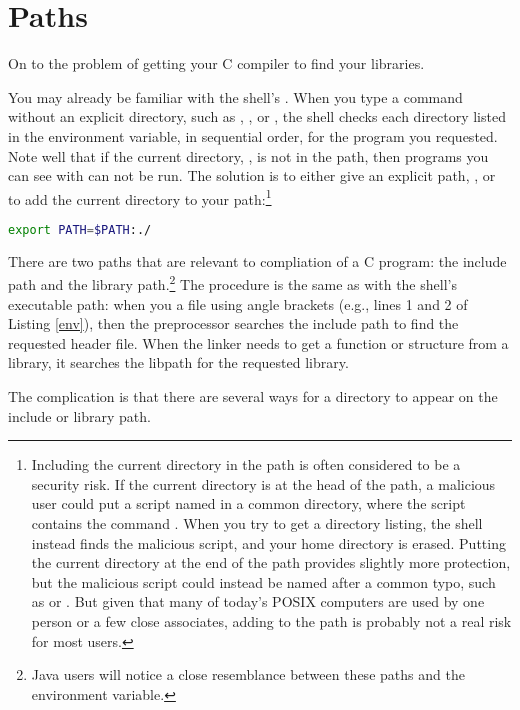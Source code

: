 \section{Paths} On to the problem of getting your C compiler to
find your libraries. 

You may already be familiar with the shell's . When you type
a command without an explicit directory, such as , , or
, the shell checks each directory listed in the 
environment variable, in sequential order, for the program you
requested. Note well that if the current directory, , is not in
the path, then programs you can see with  can not be run. The
solution is to either give an explicit path, , or to add
the current directory to your path:\footnote{Including the current
directory in the path is often considered to be a security risk. If the
current directory is at the head of the path, a
malicious user could put a script named  in a common directory,
where the script
contains the command . When you try to get a directory
listing, the shell instead finds the malicious script, and your home
directory is erased. Putting the current directory at the end of the
path provides slightly more protection, but the malicious script could
instead be named after a common typo, such as  or .
But given that many of today's POSIX computers are used by one person
or a few close associates, adding  to the path is probably not
a real risk for most users.}
\begin{lstlisting}[language=sh]
export PATH=$PATH:./
\end{lstlisting}

There are two paths that are relevant to compliation of a C program: the
include path and the library path.\footnote{Java users will notice a
close resemblance between these paths and the  environment
variable.} The procedure is the same as with the shell's executable
path: when you  a file using angle brackets (e.g., lines
1 and 2 of Listing \ref{env}), then the preprocessor
searches the include path to find the requested header file. When the
linker needs to get a function or structure from a library, it searches
the libpath for the requested library.

The complication is that there are several ways for a directory to
appear on the include or library path.

